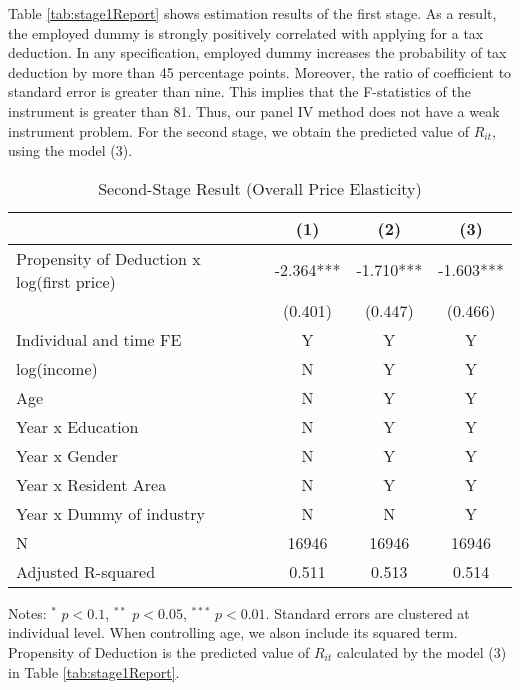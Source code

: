 \documentclass[
  11pt,
  a4paper,
]{article}
\begin{document}
Table \ref{tab:stage1Report} shows estimation results of the first stage.
As a result, the employed dummy is strongly positively correlated with applying for a tax deduction.
In any specification, employed dummy increases the probability of tax deduction by more than 45 percentage points.
Moreover, the ratio of coefficient to standard error is greater than nine.
This implies that the F-statistics of the instrument is greater than 81.
Thus, our panel IV method does not have a weak instrument problem.
For the second stage, we obtain the predicted value of \(R_{it}\), using the model (3).

\begin{table}

\caption{\label{tab:OverallReport}Second-Stage Result (Overall Price Elasticity)}
\centering
\fontsize{7}{9}\selectfont
\begin{threeparttable}
\begin{tabular}[t]{lccc}
\toprule
 & (1) & (2) & (3)\\
\midrule
Propensity of Deduction x log(first price) & -2.364*** & -1.710*** & -1.603***\\
 & (0.401) & (0.447) & (0.466)\\
Individual and time FE & Y & Y & Y\\
log(income) & N & Y & Y\\
Age & N & Y & Y\\
Year x Education & N & Y & Y\\
Year x Gender & N & Y & Y\\
Year x Resident Area & N & Y & Y\\
Year x Dummy of industry & N & N & Y\\
N & 16946 & 16946 & 16946\\
Adjusted R-squared & 0.511 & 0.513 & 0.514\\
\bottomrule
\end{tabular}
\begin{tablenotes}
\item Notes: $^{*}$ $p < 0.1$, $^{**}$ $p < 0.05$, $^{***}$ $p < 0.01$. Standard errors are clustered at individual level. When controlling age, we alson include its squared term. Propensity of Deduction is the predicted value of $R_{it}$ calculated by the model (3) in Table \ref{tab:stage1Report}.
\end{tablenotes}
\end{threeparttable}
\end{table}
\end{document}
